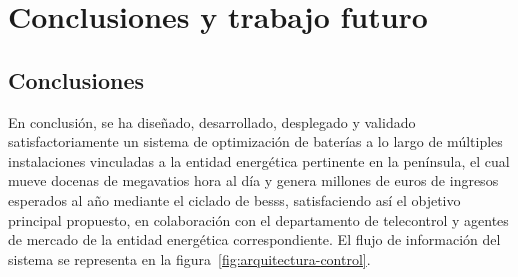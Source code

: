 \cleardoublepage%

\chapter{Conclusiones y trabajo futuro}%
\label{makereference8}

\section{Conclusiones}%
\label{makereference8.1}

En conclusión, se ha diseñado, desarrollado, desplegado y validado satisfactoriamente un sistema de optimización de baterías a lo largo de múltiples instalaciones vinculadas a la entidad energética pertinente en la península, el cual mueve docenas de megavatios hora al día y genera millones de euros de ingresos esperados al año mediante el ciclado de \glspl{bess}, satisfaciendo así el objetivo principal propuesto, en colaboración con el departamento de telecontrol y agentes de mercado de la entidad energética correspondiente. El flujo de información del sistema se representa en la figura~\ref{fig:arquitectura-control}.

